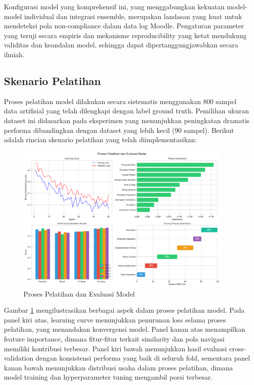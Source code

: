 Konfigurasi model yang komprehensif ini, yang menggabungkan kekuatan model-model individual dan integrasi ensemble, merupakan landasan yang kuat untuk mendeteksi pola non-compliance dalam data log Moodle. Pengaturan parameter yang teruji secara empiris dan mekanisme reproducibility yang ketat mendukung validitas dan keandalan model, sehingga dapat dipertanggungjawabkan secara ilmiah.

\subsection{Skenario Pelatihan}
\label{subsec:skenarioPelatihan}

Proses pelatihan model dilakukan secara sistematis menggunakan 800 sampel data artifisial yang telah dilengkapi dengan label ground truth. Pemilihan ukuran dataset ini didasarkan pada eksperimen yang menunjukkan peningkatan dramatis performa dibandingkan dengan dataset yang lebih kecil (90 sampel). Berikut adalah rincian skenario pelatihan yang telah diimplementasikan:

\begin{figure}[htbp]
    \centering
    \includegraphics[width=0.95\textwidth]{figures/training_process.pdf}
    \caption{Proses Pelatihan dan Evaluasi Model}
    \label{fig:training_process}
\end{figure}

Gambar \ref{fig:training_process} mengilustrasikan berbagai aspek dalam proses pelatihan model. Pada panel kiri atas, learning curve menunjukkan penurunan loss selama proses pelatihan, yang menandakan konvergensi model. Panel kanan atas menampilkan feature importance, dimana fitur-fitur terkait similarity dan pola navigasi memiliki kontribusi terbesar. Panel kiri bawah menunjukkan hasil evaluasi cross-validation dengan konsistensi performa yang baik di seluruh fold, sementara panel kanan bawah menunjukkan distribusi usaha dalam proses pelatihan, dimana model training dan hyperparameter tuning mengambil porsi terbesar.


